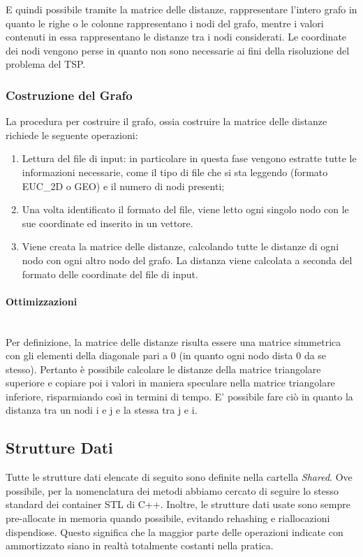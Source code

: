 E quindi possibile tramite la matrice delle distanze, rappresentare l'intero grafo in quanto le righe o le colonne rappresentano i nodi del grafo, mentre i valori contenuti in essa rappresentano le distanze tra i nodi considerati. Le coordinate dei nodi vengono perse in quanto non sono necessarie ai fini della risoluzione del problema del TSP.


\subsubsection {Costruzione del Grafo}
La procedura per costruire il grafo, ossia costruire la matrice delle distanze richiede le seguente operazioni:
\begin{enumerate}
    \item Lettura del file di input: in particolare in questa fase vengono estratte tutte le informazioni necessarie, come il tipo di file che si sta leggendo (formato EUC\_2D o GEO) e il numero di nodi presenti; 
    \item Una volta identificato il formato del file, viene letto ogni singolo nodo con le sue coordinate ed inserito in un vettore.
    \item Viene creata la matrice delle distanze, calcolando tutte le distanze di ogni nodo con ogni altro nodo del grafo. La distanza viene calcolata a seconda del formato delle coordinate del file di input.
\end{enumerate}

\paragraph{Ottimizzazioni}\mbox{} \\
\noindent Per definizione, la matrice delle distanze risulta essere una matrice simmetrica con gli elementi della diagonale pari a 0 (in quanto ogni nodo dista 0 da se stesso). Pertanto è possibile calcolare le distanze della matrice triangolare superiore e copiare poi i valori in maniera speculare nella matrice triangolare inferiore, risparmiando così in termini di tempo. E' possibile fare ciò in quanto la distanza tra un nodi i e j e la stessa tra j e i.\\


\subsection{Strutture Dati}

Tutte le strutture dati elencate di seguito sono definite nella cartella \textit{Shared}.
Ove possibile, per la nomenclatura dei metodi abbiamo cercato di seguire lo stesso standard dei container STL di C++.
Inoltre, le strutture dati usate sono sempre pre-allocate in memoria quando possibile, evitando rehashing e riallocazioni dispendiose. Questo significa che la maggior parte delle operazioni indicate con \complexityConstant{} ammortizzato siano in realtà totalmente costanti nella pratica.

